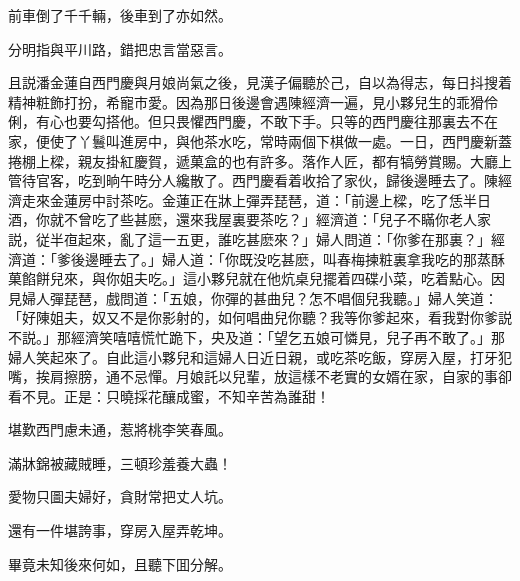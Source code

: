 \begin{myquote}
前車倒了千千輛，後車到了亦如然。

分明指與平川路，錯把忠言當惡言。
\end{myquote}

且説潘金蓮自西門慶與月娘尚氣之後，見漢子偏聽於己，自以為得志，每日抖搜着精神粧飾打扮，希寵巿愛。因為那日後邊會遇陳經濟一遍，見小夥兒生的乖猾伶俐，有心也要勾搭他。但只畏懼西門慶，不敢下手。只等的西門慶往那裏去不在家，便使了丫鬟叫進房中，與他茶水吃，常時兩個下棋做一處。一日，西門慶新蓋捲棚上樑，親友掛紅慶賀，遞菓盒的也有許多。落作人匠，都有犒勞賞賜。大廳上管待官客，吃到晌午時分人纔散了。西門慶看着收拾了家伙，歸後邊睡去了。陳經濟走來金蓮房中討茶吃。金蓮正在牀上彈弄琵琶，道：「前邊上樑，吃了恁半日酒，你就不曾吃了些甚麽，還來我屋裏要茶吃？」經濟道：「兒子不瞞你老人家説，従半亱起來，亂了這一五更，誰吃甚麽來？」婦人問道：「你爹在那裏？」經濟道：「爹後邊睡去了。」婦人道：「你既没吃甚麽，叫春梅揀粧裏拿我吃的那蒸酥菓餡餅兒來，與你姐夫吃。」這小夥兒就在他炕桌兒擺着四碟小菜，吃着點心。因見婦人彈琵琶，戲問道：「五娘，你彈的甚曲兒？怎不唱個兒我聽。」婦人笑道：「好陳姐夫，奴又不是你影射的，如何唱曲兒你聽？我等你爹起來，看我對你爹説不説。」那經濟笑嘻嘻慌忙跪下，央及道：「望乞五娘可憐見，兒子再不敢了。」那婦人笑起來了。自此這小夥兒和這婦人日近日親，或吃茶吃飯，穿房入屋，打牙犯嘴，挨肩擦膀，通不忌憚。月娘託以兒輩，放這樣不老實的女婿在家，自家的事卻看不見。正是：只曉採花釀成蜜，不知辛苦為誰甜！

\begin{myquote}
堪歎西門慮未通，惹將桃李笑春風。

滿牀錦被藏賊睡，三頓珍羞養大蟲！

愛物只圖夫婦好，貪財常把丈人坑。

還有一件堪誇事，穿房入屋弄乾坤。
\end{myquote}

畢竟未知後來何如，且聽下囬分解。

